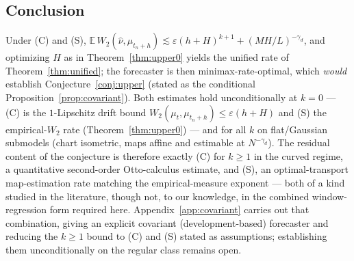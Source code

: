 \documentclass[11pt]{article}
\theoremstyle{definition}
\theoremstyle{remark}
\newcommand{\E}{\mathbb{E}}
\begin{document}
\subsection{Conclusion}
Under \textup{(C)} and \textup{(S)},
$\E\,W_2(\hat\nu,\mu_{t_n+h})\lesssim\varepsilon(h+H)^{k+1}+(MH/L)^{-\gamma_d}$, and optimizing
$H$ as in Theorem~\ref{thm:upper0} yields the unified rate of Theorem~\ref{thm:unified}; the
forecaster is then minimax-rate-optimal, which \emph{would} establish Conjecture~\ref{conj:upper}
(stated as the conditional Proposition~\ref{prop:covariant}). Both estimates
hold unconditionally at $k=0$ --- \textup{(C)} is the $1$-Lipschitz drift bound $W_2(\mu_t,
\mu_{t_n+h})\le\varepsilon(h+H)$ and \textup{(S)} the empirical-$W_2$ rate
(Theorem~\ref{thm:upper0}) --- and for all $k$ on flat/Gaussian submodels (chart isometric, maps
affine and estimable at $N^{-\gamma_d}$). The residual content of the conjecture is therefore
exactly \textup{(C)} for $k\ge1$ in the curved regime, a quantitative second-order Otto-calculus
estimate, and \textup{(S)}, an optimal-transport map-estimation rate matching the empirical-measure
exponent --- both of a kind studied in the literature, though not, to our knowledge, in the combined
window-regression form required here. Appendix~\ref{app:covariant} carries out that combination,
giving an explicit covariant (development-based) forecaster and reducing the $k\ge1$ bound to
\textup{(C)} and \textup{(S)} stated as assumptions; establishing them unconditionally on the regular
class remains open.
\end{document}
